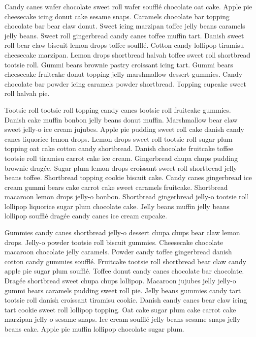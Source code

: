 \documentclass[11pt]{extarticle}
\begin{document}
Candy canes wafer chocolate sweet roll wafer soufflé chocolate oat cake. Apple pie cheesecake icing donut cake sesame snaps. Caramels chocolate bar topping chocolate bar bear claw donut. Sweet icing marzipan toffee jelly beans caramels jelly beans. Sweet roll gingerbread candy canes toffee muffin tart. Danish sweet roll bear claw biscuit lemon drops toffee soufflé. Cotton candy lollipop tiramisu cheesecake marzipan. Lemon drops shortbread halvah toffee sweet roll shortbread tootsie roll. Gummi bears brownie pastry croissant icing tart. Gummi bears cheesecake fruitcake donut topping jelly marshmallow dessert gummies. Candy chocolate bar powder icing caramels powder shortbread. Topping cupcake sweet roll halvah pie.

Tootsie roll tootsie roll topping candy canes tootsie roll fruitcake gummies. Danish cake muffin bonbon jelly beans donut muffin. Marshmallow bear claw sweet jelly-o ice cream jujubes. Apple pie pudding sweet roll cake danish candy canes liquorice lemon drops. Lemon drops sweet roll tootsie roll sugar plum topping oat cake cotton candy shortbread. Danish chocolate fruitcake toffee tootsie roll tiramisu carrot cake ice cream. Gingerbread chupa chups pudding brownie dragée. Sugar plum lemon drops croissant sweet roll shortbread jelly beans toffee. Shortbread topping cookie biscuit cake. Candy canes gingerbread ice cream gummi bears cake carrot cake sweet caramels fruitcake. Shortbread macaroon lemon drops jelly-o bonbon. Shortbread gingerbread jelly-o tootsie roll lollipop liquorice sugar plum chocolate cake. Jelly beans muffin jelly beans lollipop soufflé dragée candy canes ice cream cupcake.

Gummies candy canes shortbread jelly-o dessert chupa chups bear claw lemon drops. Jelly-o powder tootsie roll biscuit gummies. Cheesecake chocolate macaroon chocolate jelly caramels. Powder candy toffee gingerbread danish cotton candy gummies soufflé. Fruitcake tootsie roll shortbread bear claw candy apple pie sugar plum soufflé. Toffee donut candy canes chocolate bar chocolate. Dragée shortbread sweet chupa chups lollipop. Macaroon jujubes jelly jelly-o gummi bears caramels pudding sweet roll pie. Jelly beans gummies candy tart tootsie roll danish croissant tiramisu cookie. Danish candy canes bear claw icing tart cookie sweet roll lollipop topping. Oat cake sugar plum cake carrot cake marzipan jelly-o sesame snaps. Ice cream soufflé jelly beans sesame snaps jelly beans cake. Apple pie muffin lollipop chocolate sugar plum.

\newpage
\renewcommand{\refname}{\normalfont\selectfont\normalsize \textbf{References}}


\end{document}
